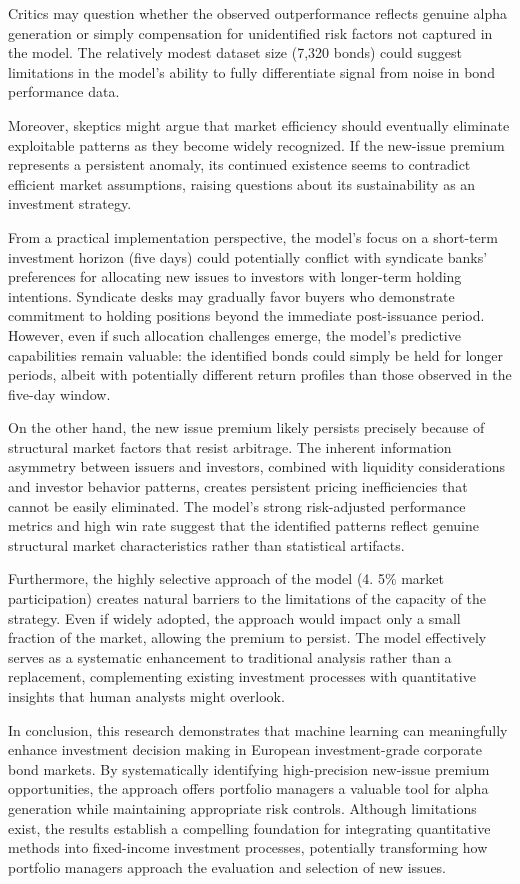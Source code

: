Critics may question whether the observed outperformance reflects genuine alpha generation or simply compensation for unidentified risk factors not captured in the model. The relatively modest dataset size (7,320 bonds) could suggest limitations in the model's ability to fully differentiate signal from noise in bond performance data.

Moreover, skeptics might argue that market efficiency should eventually eliminate exploitable patterns as they become widely recognized. If the new-issue premium represents a persistent anomaly, its continued existence seems to contradict efficient market assumptions, raising questions about its sustainability as an investment strategy.

From a practical implementation perspective, the model's focus on a short-term investment horizon (five days) could potentially conflict with syndicate banks' preferences for allocating new issues to investors with longer-term holding intentions. Syndicate desks may gradually favor buyers who demonstrate commitment to holding positions beyond the immediate post-issuance period. However, even if such allocation challenges emerge, the model's predictive capabilities remain valuable: the identified bonds could simply be held for longer periods, albeit with potentially different return profiles than those observed in the five-day window.

On the other hand, the new issue premium likely persists precisely because of structural market factors that resist arbitrage. The inherent information asymmetry between issuers and investors, combined with liquidity considerations and investor behavior patterns, creates persistent pricing inefficiencies that cannot be easily eliminated. The model's strong risk-adjusted performance metrics and high win rate suggest that the identified patterns reflect genuine structural market characteristics rather than statistical artifacts.

Furthermore, the highly selective approach of the model (4. 5\% market participation) creates natural barriers to the limitations of the capacity of the strategy. Even if widely adopted, the approach would impact only a small fraction of the market, allowing the premium to persist. The model effectively serves as a systematic enhancement to traditional analysis rather than a replacement, complementing existing investment processes with quantitative insights that human analysts might overlook.

In conclusion, this research demonstrates that machine learning can meaningfully enhance investment decision making in European investment-grade corporate bond markets. By systematically identifying high-precision new-issue premium opportunities, the approach offers portfolio managers a valuable tool for alpha generation while maintaining appropriate risk controls. Although limitations exist, the results establish a compelling foundation for integrating quantitative methods into fixed-income investment processes, potentially transforming how portfolio managers approach the evaluation and selection of new issues.